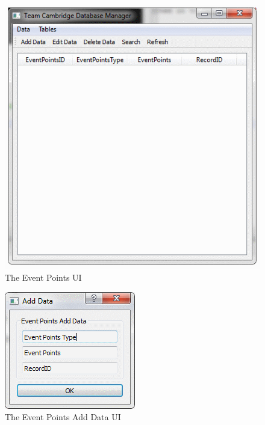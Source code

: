 \begin{figure}
\includegraphics[width=\textwidth]{./Maintenance/UI/EventPoints.png}
\caption{The Event Points UI} \label{fig:EventPoints_UI}
\end{figure}

\begin{figure}
\includegraphics[width=\textwidth]{./Maintenance/UI/EventPointsAD.png}
\caption{The Event Points Add Data UI} \label{fig:EventPointsAD_UI}
\end{figure}

